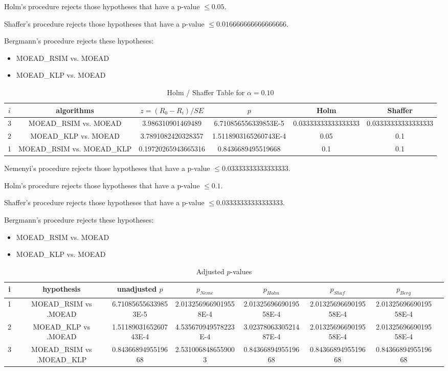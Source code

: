 \documentclass[a4paper,10pt]{article}
\begin{document}
\begin{landscape}
Holm's procedure rejects those hypotheses that have a p-value $\le0.05$.


Shaffer's procedure rejects those hypotheses that have a p-value $\le0.016666666666666666$.


Bergmann's procedure rejects these hypotheses:


\begin{itemize}


\item MOEAD_RSIM vs. MOEAD
\item MOEAD_KLP vs. MOEAD
\end{itemize}


\begin{table}[!htp]
\centering\tiny
\caption{Holm / Shaffer Table for $\alpha=0.10$}
\begin{tabular}{cccccc}
$i$&algorithms&$z=(R_0 - R_i)/SE$&$p$&Holm&Shaffer\\
\hline
3&MOEAD_RSIM vs. MOEAD&3.986310901469489&6.710856556339853E-5&0.03333333333333333&0.03333333333333333\\
2&MOEAD_KLP vs. MOEAD&3.7891082420328357&1.5118903165260743E-4&0.05&0.1\\
1&MOEAD_RSIM vs. MOEAD_KLP&0.19720265943665316&0.8436689495519668&0.1&0.1\\
\hline
\end{tabular}
\end{table}
Nemenyi's procedure rejects those hypotheses that have a p-value $\le0.03333333333333333$.


Holm's procedure rejects those hypotheses that have a p-value $\le0.1$.


Shaffer's procedure rejects those hypotheses that have a p-value $\le0.03333333333333333$.


Bergmann's procedure rejects these hypotheses:


\begin{itemize}


\item MOEAD_RSIM vs. MOEAD
\item MOEAD_KLP vs. MOEAD
\end{itemize}


\begin{table}[!htp]
\centering\tiny
\caption{Adjusted $p$-values}
\begin{tabular}{cccccccc}
i&hypothesis&unadjusted $p$&$p_{Neme}$&$p_{Holm}$&$p_{Shaf}$&$p_{Berg}$\\
\hline
1&MOEAD_RSIM vs .MOEAD&6.710856556339853E-5&2.0132569669019558E-4&2.0132569669019558E-4&2.0132569669019558E-4&2.0132569669019558E-4\\
2&MOEAD_KLP vs .MOEAD&1.5118903165260743E-4&4.535670949578223E-4&3.0237806330521487E-4&2.0132569669019558E-4&2.0132569669019558E-4\\
3&MOEAD_RSIM vs .MOEAD_KLP&0.8436689495519668&2.5310068486559003&0.8436689495519668&0.8436689495519668&0.8436689495519668\\
\hline
\end{tabular}
\end{table}

\end{landscape}
\end{document}
